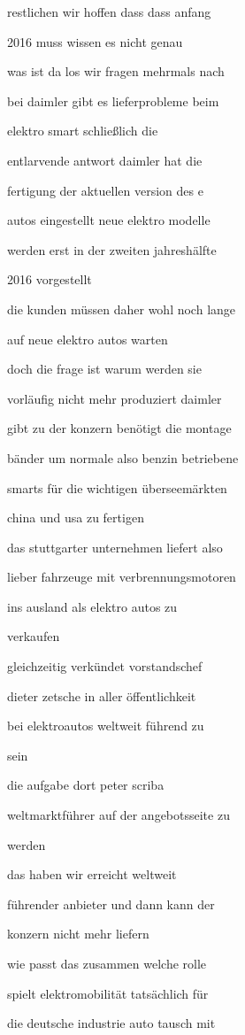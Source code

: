 \documentclass[a4paper, 11pt]{book} %
\begin{document}
restlichen wir hoffen dass dass anfang

2016 muss wissen es nicht genau

was ist da los wir fragen mehrmals nach

bei daimler gibt es lieferprobleme beim

elektro smart schließlich die

entlarvende antwort daimler hat die

fertigung der aktuellen version des e

autos eingestellt neue elektro modelle

werden erst in der zweiten jahreshälfte

2016 vorgestellt

die kunden müssen daher wohl noch lange

auf neue elektro autos warten

doch die frage ist warum werden sie

vorläufig nicht mehr produziert daimler

gibt zu der konzern benötigt die montage

bänder um normale also benzin betriebene

smarts für die wichtigen überseemärkten

china und usa zu fertigen

das stuttgarter unternehmen liefert also

lieber fahrzeuge mit verbrennungsmotoren

ins ausland als elektro autos zu

verkaufen

gleichzeitig verkündet vorstandschef

dieter zetsche in aller öffentlichkeit

bei elektroautos weltweit führend zu

sein

die aufgabe dort peter scriba

weltmarktführer auf der angebotsseite zu

werden

das haben wir erreicht weltweit

führender anbieter und dann kann der

konzern nicht mehr liefern

wie passt das zusammen welche rolle

spielt elektromobilität tatsächlich für

die deutsche industrie auto tausch mit
\end{document}
